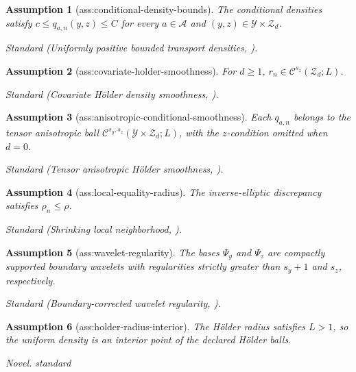\documentclass{article}
\newtheorem{assumption}{Assumption}
\begin{document}
\begin{assumption}[ass:conditional-density-bounds]\label{ass:conditional-density-bounds}
The conditional densities satisfy \(c\le q_{a,n}(y,z)\le C\) for every \(a\in\mathcal A\) and \((y,z)\in\mathcal Y\times\mathcal Z_d\).
\par\smallskip\noindent\emph{Standard} (Uniformly positive bounded transport densities, \cite{LinGaoBlanchetGlynn2026SmoothCOT}).
\end{assumption}

\begin{assumption}[ass:covariate-holder-smoothness]\label{ass:covariate-holder-smoothness}
For \(d\ge1\), \(r_n\in\mathcal C^{s_z}(\mathcal Z_d;L)\).
\par\smallskip\noindent\emph{Standard} (Covariate H\"older density smoothness, \cite{NilesWeedBerthet2022}).
\end{assumption}

\begin{assumption}[ass:anisotropic-conditional-smoothness]\label{ass:anisotropic-conditional-smoothness}
Each \(q_{a,n}\) belongs to the tensor anisotropic ball \(\mathcal C^{s_y,s_z}(\mathcal Y\times\mathcal Z_d;L)\), with the \(z\)-condition omitted when \(d=0\).
\par\smallskip\noindent\emph{Standard} (Tensor anisotropic H\"older smoothness, \cite{CohenDaubechiesVial1993}).
\end{assumption}

\begin{assumption}[ass:local-equality-radius]\label{ass:local-equality-radius}
The inverse-elliptic discrepancy satisfies \(\rho_n\le\rho\).
\par\smallskip\noindent\emph{Standard} (Shrinking local neighborhood, \cite{ChenFang2019}).
\end{assumption}

\begin{assumption}[ass:wavelet-regularity]\label{ass:wavelet-regularity}
The bases \(\Psi_y\) and \(\Psi_z\) are compactly supported boundary wavelets with regularities strictly greater than \(s_y+1\) and \(s_z\), respectively.
\par\smallskip\noindent\emph{Standard} (Boundary-corrected wavelet regularity, \cite{CohenDaubechiesVial1993}).
\end{assumption}

\begin{assumption}[ass:holder-radius-interior]\label{ass:holder-radius-interior}
The H\"older radius satisfies \(L>1\), so the uniform density is an interior point of the declared H\"older balls.
\par\smallskip\noindent\emph{Novel.} standard
\end{assumption}
\end{document}
